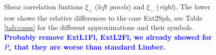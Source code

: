 \documentclass[useAMS,usenatbib]{mn2e} %
\newcommand{\mk}[1]{{\bf\textcolor{blue}{#1}}}
\begin{document}
\begin{figure}
\begin{center}
  \end{center}

  \caption{Shear correlation funtions $\xi_+$ (\emph{left panels}) and $\xi_-$ (\emph{right}).
    The lower row shows the relative differences to the case Ext2Sph,  see Table \ref{tab:cases} for the different
    approximations and their symbols.
    \mk{Probably remove ExtL1Fl, ExtL2Fl, we already showed for $P_\kappa$ that they are worse than standard
    Limber.}
  }

  \label{fig:xi_pm_K16}

\end{figure}
\end{document}
